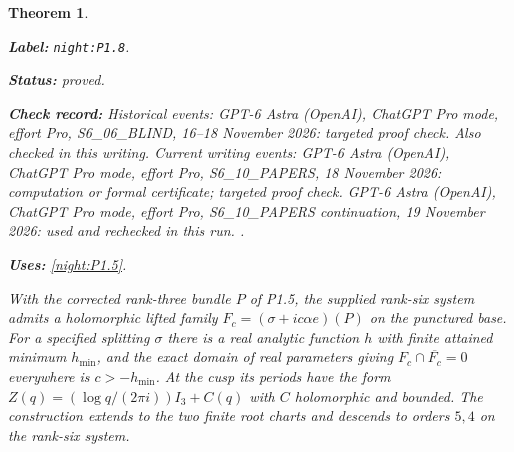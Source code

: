 \documentclass[11pt,a4paper]{article}
\newtheorem{theorem}{Theorem}[section]
\theoremstyle{definition}
\newcommand{\StatementRecord}[4]{\par\smallskip\begingroup\upshape\raggedright\noindent\textbf{Label:} \nolinkurl{#1}.\par\noindent\textbf{Status:} #2.\par\noindent\textbf{Check record:} #3.\par\noindent\textbf{Uses:} #4.\par\endgroup\smallskip}
\begin{document}
\begin{theorem}\label{night:P1.8}
\StatementRecord{night:P1.8}{proved}{Historical events: GPT-6 Astra (OpenAI), ChatGPT Pro mode, effort Pro, S6\_06\_BLIND, 16--18 November 2026: targeted proof check. Also checked in this writing. Current writing events: GPT-6 Astra (OpenAI), ChatGPT Pro mode, effort Pro, S6\_10\_PAPERS, 18 November 2026: computation or formal certificate; targeted proof check. GPT-6 Astra (OpenAI), ChatGPT Pro mode, effort Pro, S6\_10\_PAPERS continuation, 19 November 2026: used and rechecked in this run. }{\cref{night:P1.5}}
With the corrected rank-three bundle $P$ of P1.5, the supplied rank-six
system admits a holomorphic lifted family
$F_c=(\sigma+ic\alpha e)(P)$ on the punctured base.
For a specified splitting $\sigma$ there is a real analytic function
$h$ with finite attained minimum $h_{\min}$, and the exact domain of
real parameters giving $F_c\cap\overline{F_c}=0$ everywhere is
$c>-h_{\min}$.
At the cusp its periods have the form
$Z(q)=(\log q/(2\pi i))I_3+C(q)$ with $C$ holomorphic and bounded.
The construction extends to the two finite root charts and descends to
orders $5,4$ on the rank-six system.
\end{theorem}
\end{document}

